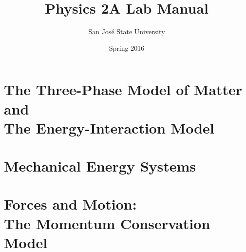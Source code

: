 \documentclass[12pt,onecolumn,letterpaper]{book}
\title{{\bf Physics 2A Lab Manual}
\iftoggle{instructor}
	{\\ {\Large Instructor Edition}}
	{\\ {\Large Student Edition}}
}
\author{San Jos\'{e} State University}
\date{Spring 2016}
\renewcommand{\chaptername}{CH~}			%
\newcommand{\ThreePhaseModel}{\textbf{Three-Phase Model of Matter}}
\newcommand{\EnergyInteractionModel}{\textbf{Energy-Interaction Model}}
\newcommand{\pModel}{\textbf{Momentum Conservation Model}}
\begin{document}
%
%

\frontmatter

\maketitle
\thispagestyle{empty}\setcounter{page}{0}
\begingroup
	\hypersetup{linkcolor=black}		%
	\tableofcontents
	\listofFNTs
\endgroup


%
%

\mainmatter

\pagestyle{fancy}
	\fancyhf{}
	\fancyhead[LE,RO]{\chaptername\thechapter}		%
	\renewcommand{\footrulewidth}{0.4pt}	%
	\cfoot{\thepage}		%




			

\part[\ThreePhaseModel{} \& \EnergyInteractionModel{}]{The \ThreePhaseModel{}\\ and\\ The \EnergyInteractionModel{}}
\label{Unit1}

	
	
\part{Mechanical Energy Systems}
\label{Unit2}
	
	
	
\part[Forces and Motion: Momentum Conservation]{Forces and Motion:\\The \pModel{}}
\label{Unit6}
	
	
	
\end{document}
